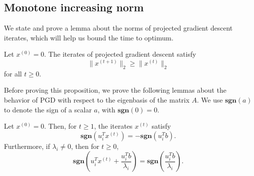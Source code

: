 \documentclass[11pt]{article}
\begin{document}
\subsection{Monotone increasing norm}
We state and prove a lemma about the norms of projected gradient descent iterates, which will help us bound the time to optimum.
\begin{prop}\label{prop:increasing-norm}
Let $x^{(0)} = 0$. The iterates of projected gradient descent satisfy
\begin{equation} \label{eqn:incr-norm}
\|x^{(t+1)}\|_2 \geq \|x^{(t)}\|_2
\end{equation}
for all $t \geq 0$.
\end{prop}
Before proving this proposition, we prove the following lemmas about the behavior of PGD with respect to the eigenbasis of the matrix $A$. We use
$\mathbf{sgn}(a)$ to denote the sign of a scalar $a$, with $\mathbf{sgn}(0) = 0$.
\begin{lem}\label{lem:signs}
Let $x^{(0)} = 0$. Then, for $t \geq 1$, the iterates $x^{(t)}$ satisfy
\begin{equation}\label{eqn:sign1}
\mathbf{sgn}(u_i^Tx^{(t)}) = -\mathbf{sgn}(u_i^Tb).
\end{equation}
Furthermore, if $\lambda_i \neq 0$, then for $t \geq 0$,
\begin{equation}
\mathbf{sgn}\left(u_i^Tx^{(t)} + \frac{u_i^Tb}{\lambda_i}\right) = \mathbf{sgn}\left( \frac{u_i^Tb}{\lambda_i}\right).
\end{equation}
\end{lem}
\end{document}

